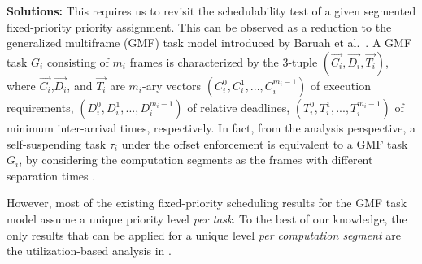 {\bf Solutions:} This requires us to revisit the schedulability test of a given segmented fixed-priority priority assignment. This can be observed as a reduction to 
the generalized multiframe (GMF) task model introduced by Baruah et al.~\cite{baruah1999generalized}. A GMF task $G_i$ consisting of $m_i$ frames is characterized by the $3$-tuple $(\vec{C_i},\vec{D_i},\vec{T_i})$, where $\vec{C_i}$,$\vec{D_i}$, and $\vec{T_i}$ are $m_i$-ary vectors $(C_{i}^0,C_{i}^1,...,C_{i}^{m_i-1})$ of execution requirements, $(D_{i}^0,D_{i}^1,...,D_{i}^{m_i-1})$ of relative deadlines, $(T_{i}^0,T_{i}^1,...,T_{i}^{m_i-1})$ of minimum inter-arrival times, respectively.
In fact, from the analysis perspective, a self-suspending task $\tau_i$ under the offset enforcement is equivalent to a GMF task $G_i$,  by considering the computation segments as the frames with different separation times \cite{WC16-suspend-DATE,DBLP:journals/ieicet/DingTT09}.

However, most of the existing fixed-priority scheduling results for the GMF task model assume a unique priority level \emph{per task}. To the best of our knowledge, the only results that can be applied for a unique level \emph{per computation segment} are the utilization-based analysis in \cite{DBLP:journals/corr/ChenHL15b,huang2015mode}. 




